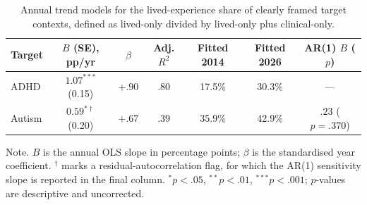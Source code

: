 \begin{table}[t!]
\caption{Annual trend models for the lived-experience share of clearly framed target
contexts, defined as lived-only divided by lived-only plus clinical-only.}
\label{tab:composition}
\small
\begin{tabular}{@{}lcccccc@{}}
\toprule
Target & $B$ (SE), pp/yr & $\beta$ & Adj. $R^2$ & Fitted 2014 & Fitted 2026 & AR(1) $B$ ($p$) \\
\midrule
ADHD & $1.07^{***}$ (0.15) & $+.90$ & $.80$ & 17.5\% & 30.3\% & --- \\
Autism & $0.59^{*\dagger}$ (0.20) & $+.67$ & $.39$ & 35.9\% & 42.9\% & $.23$ ($p = .370$) \\
\bottomrule
\end{tabular}
\par\vspace{3pt}
\parbox{\linewidth}{\footnotesize Note. $B$ is the annual OLS slope in percentage points;
$\beta$ is the standardised year coefficient. $^{\dagger}$ marks a residual-autocorrelation
flag, for which the AR(1) sensitivity slope is reported in the final column.
$^{*}p<.05$, $^{**}p<.01$, $^{***}p<.001$; $p$-values are descriptive and uncorrected.}
\end{table}
